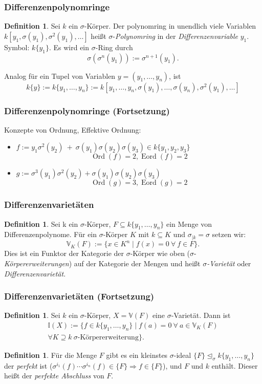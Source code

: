 \documentclass{beamer}
\def\I{\mathbb{I}}
\def\VV{\mathbb{V}}
\def\s{\sigma}
\def\si{\unlhd_{\sigma}}
\theoremstyle{definition}
\newtheorem{defn}[satz]{Definition}
\begin{document}
\begin{frame}\frametitle{Differenzenpolynomringe}
\begin{defn}
Sei $k$ ein $\s$-Körper. Der polynomring in unendlich viele Variablen $k[y_1,\s(y_1),\s^2(y_1),\ldots]$ heißt $\s$-\emph{Polynomring} in der \emph{Differenzenvariable} $y_1$. Symbol: $k\{y_1\}.$
Es wird ein $\s$-Ring durch $$\s( \s^n(y_1)) := \s^{n+1}(y_1).$$

 Analog für ein Tupel von Variablen $y=(y_1,\ldots,y_n)$, ist $$ k\{y\} := k\{y_1,\ldots,y_n\} := k[y_1,\ldots,y_n,\s(y_1),\ldots,\s(y_n),\s^2(y_1),\ldots] $$
\end{defn}
\end{frame}

\begin{frame}\frametitle{Differenzenpolynomringe (Fortsetzung)}
Konzepte von Ordnung, Effektive Ordnung:
\begin{itemize}
\item $ f:= y_1 \s^2(y_2)~+~\s(y_1)\s(y_2)\s(y_3) \in k\{y_1,y_2,y_3\}$
$$ \operatorname{Ord}(f) = 2, \operatorname{Eord}(f) = 2 $$
\item $g := \s^3(y_1) \s^2(y_2) + \s(y_1)\s(y_2)\s(y_3)$
$$ \operatorname{Ord}(g) = 3, \operatorname{Eord}(g) = 2 $$
\end{itemize}
\end{frame}



\begin{frame}\frametitle{Differenzenvarietäten}
\begin{defn}
Sei k ein $\s$-Körper, $F \subseteq k\{y_1,\ldots,y_n\}$ ein Menge von Differenzenpolynome. 
Für ein $\s$-Körper $K$ mit $k \subseteq K$ und $\s_{|k} = \s$ setzen wir:
$$\VV_K(F) := \{ x \in K^n \mid f(x) = 0~\forall~ f \in F \}.$$
Dies ist ein Funktor der Kategorie der $\s$-Körper wie oben ($\s$-\emph{Körpererweiterungen}) auf der Kategorie der Mengen und heißt \emph{$\s$-Varietät} oder \emph{Differenzenvarietät}.
\end{defn}
\end{frame}

\begin{frame}\frametitle{Differenzenvarietäten (Fortsetzung)}
\begin{defn}
Sei $k$ ein $\s$-Körper, $X = \VV(F)$ eine $\s$-Varietät. Dann ist 
\begin{align*} \I(X) := \{ f \in k\{y_1,\ldots,y_n \} \mid f(a) = 0~\forall~a \in \VV_K(F) \\ \forall K \supseteq k ~ \s \text{-Körpererweiterung} \}. 
\end{align*}
\end{defn}

\begin{defn}
Für die Menge $F$ gibt es ein kleinstes $\s$-ideal $\{F\} \si k\{y_1,\ldots,y_n\}$ der \emph{perfekt} ist ($\sigma^{i_1}(f) \cdots \sigma^{i_n}(f) \in \{F\} \Rightarrow f \in \{F\}$), und $F$ und $k$ enthält. 
Dieser heißt der \emph{perfekte Abschluss} von $F$.
\end{defn}
\end{frame}
\end{document}
